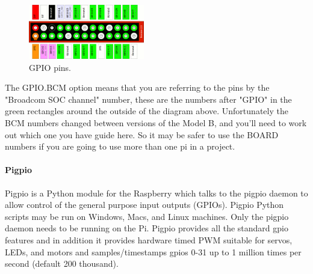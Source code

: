 \documentclass{acm_proc_article-sp}
\begin{document}
\begin{figure}[h]
\centering
    \includegraphics[width=0.45\textwidth,natwidth=610,natheight=642]{pictures/ModelAB.png}
    \caption{GPIO pins.\protect\cite{gpioHeader}}
    \label{fig:ModelAB}
\end{figure}

The GPIO.BCM option means that you are referring to the pins by the "Broadcom SOC channel" number, these are the numbers after "GPIO" in the green rectangles around the outside of the diagram above.
\newline
\newline
Unfortunately the BCM numbers changed between versions of the Model B, and you'll need to work out which one you have guide here. So it may be safer to use the BOARD numbers if you are going to use more than one pi in a project.

\paragraph{Pigpio}
Pigpio \cite{Pigpio} is a Python module for the Raspberry which talks to the pigpio daemon to allow control of the general purpose input outputs (GPIOs). Pigpio Python scripts may be run on Windows, Macs, and Linux machines. Only the pigpio daemon needs to be running on the Pi.
\newline
\newline
Pigpio provides all the standard gpio features and in addition it provides hardware timed PWM suitable for servos, LEDs, and motors and samples/timestamps gpios 0-31 up to 1 million times per second (default 200 thousand).
\end{document}
